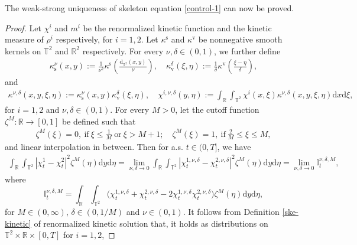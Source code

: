 The weak-strong uniqueness of skeleton equation \eqref{control-1} can now be proved.
\begin{proof}
 Let $\chi^i$ and $m^i$ be the renormalized kinetic function and the kinetic measure of $\rho^i$ respectively, for $i = 1,2$. Let $\kappa^{\mathrm{s}}$ and $\kappa^{\mathrm{v}}$ be nonnegative smooth kernels on $\mathbb{T}^2$ and $\mathbb{R}^2$ respectively. For every $ \nu,\delta\in(0,1)$, we further define 
\begin{align*} 
\kappa_{\mathrm{s}}^{\nu}(x,y) := \frac{1}{\nu^{2}}\kappa^{\mathrm{s}}\left(\frac{\mathrm{d}_{\mathbb{T}^2}(x,y)}{\nu}\right), \quad \kappa_{\mathrm{v}}^{\delta}(\xi,\eta) := \frac{1}{\delta}\kappa^{\mathrm{v}}\left(\frac{\xi - \eta}{\delta}\right),
\end{align*}
and
\begin{align*}
\kappa^{\nu,\delta}(x,y,\xi,\eta) := \kappa_{\mathrm{s}}^{\nu}(x,y) \kappa_{\mathrm{v}}^{\delta}(\xi,\eta), \quad \chi^{i,\nu,\delta}(y,\eta) := \int_{\mathbb{R}}\int_{\mathbb{T}^2}\chi^i(x,\xi)\kappa^{\nu,\delta}(x,y,\xi,\eta)\mathrm{d}x\mathrm{d}\xi,
\end{align*}
for $i = 1,2$ and $\nu,\delta\in(0,1)$.
For every $M>0$, let the cutoff function $\zeta^M:\mathbb{R}\rightarrow[0,1]$ be defined such that 
\begin{align*}
\zeta^M(\xi) = 0, \ \text{if} \ \xi \leq \frac{1}{M} \ \text{or} \ \xi > M+1; \quad \zeta^M(\xi)  = 1, \ \text{if} \ \frac{2}{M} \leq \xi \leq M, 
\end{align*}
and linear interpolation in between. Then for a.s. $t \in (0,T]$, we have 
\begin{align}\label{qq-28} 
\int_{\mathbb{R}}\int_{\mathbb{T}^2}|\chi_t^1-\chi_t^2|^2\zeta^M(\eta)\mathrm{d}y\mathrm{d}\eta = \lim_{\nu,\delta\rightarrow0}\int_{\mathbb{R}}\int_{\mathbb{T}^2}\left|\chi_t^{1,\nu,\delta}-\chi_t^{2,\nu,\delta}\right|^2\zeta^M(\eta)\mathrm{d}y\mathrm{d}\eta = \lim_{\nu,\delta\rightarrow0}\mathbb{I}_t^{\nu,\delta,M},
\end{align}
where 
\begin{equation}\label{rr-11}
\mathbb{I}_t^{\nu,\delta,M}
= \int_{\mathbb{R}}\int_{\mathbb{T}^2}\Big(\chi_t^{1,\nu,\delta}
+\chi_t^{2,\nu,\delta}-2\chi_t^{1,\nu,\delta}\chi_t^{2,\nu,\delta}\Big)\zeta^M(\eta)\mathrm{d}y\mathrm{d}\eta,
\end{equation}
for $M\in(0,\infty)$, $\delta\in(0,1/M)$ and $\nu\in(0,1)$. It follows from Definition \ref{ske-kinetic} of renormalized kinetic solution that, it holds as distributions on $\mathbb{T}^2\times \mathbb{R}\times[0,T]$ for $i = 1,2$,

\end{proof}
